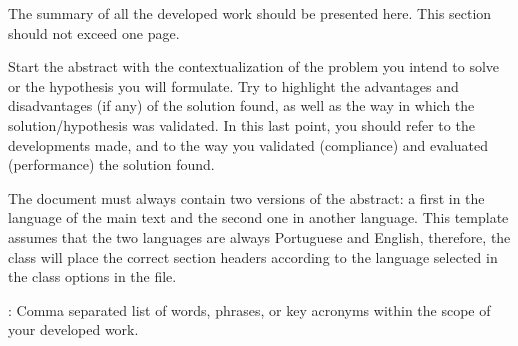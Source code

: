 \begin{secondlangabstract}

The summary of all the developed work should be presented here. This section should not exceed one page.

Start the abstract with the contextualization of the problem you intend to solve or the hypothesis you will formulate. Try to highlight the advantages and disadvantages (if any) of the solution found, as well as the way in which the solution/hypothesis was validated. In this last point, you should refer to the developments made, and to the way you validated (compliance) and evaluated (performance) the solution found.

The document must always contain two versions of the abstract: a first in the language of the main text and the second one in another language. This template assumes that the two languages are always Portuguese and English, therefore, the class will place the correct section headers according to the language selected in the class options in the  file.



\vspace*{10mm} 
\noindent
\textbf{\keywordslabel}: Comma separated list of words, phrases, or key acronyms within the scope of your developed work. 

\end{secondlangabstract}

